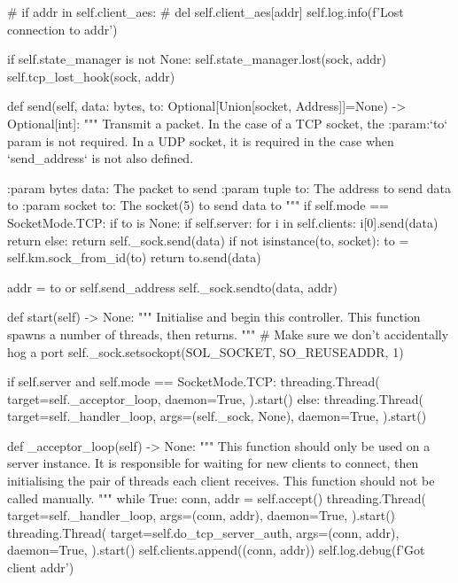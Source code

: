 \begin{pythoncode}
            # if addr in self.client\_aes:
            #     del self.client\_aes[addr]
        self.log.info(f'Lost connection to {addr}')

        if self.state_manager is not None:
            self.state_manager.lost(sock, addr)
        self.tcp_lost_hook(sock, addr)

    def send(self, data: bytes,
             to: Optional[Union[socket, Address]]=None) -> Optional[int]:
        """
        Transmit a packet. In the case of a TCP socket, the :param:`to` param
        is not required. In a UDP socket, it is required in the case when
        `send_address` is not also defined.

        :param bytes data: The packet to send
        :param tuple to: The address to send data to
        :param socket to: The socket(5) to send data to
        """
        if self.mode == SocketMode.TCP:
            if to is None:
                if self.server:
                    for i in self.clients:
                        i[0].send(data)
                    return
                else:
                    return self._sock.send(data)
            if not isinstance(to, socket):
                to = self.km.sock_from_id(to)
            return to.send(data)

        addr = to or self.send_address
        self._sock.sendto(data, addr)

    def start(self) -> None:
        """
        Initialise and begin this controller. This function spawns a number of
        threads, then returns.
        """
        # Make sure we don't accidentally hog a port
        self._sock.setsockopt(SOL_SOCKET, SO_REUSEADDR, 1)

        if self.server and self.mode == SocketMode.TCP:
            threading.Thread(
                target=self._acceptor_loop,
                daemon=True,
            ).start()
        else:
            threading.Thread(
                target=self._handler_loop,
                args=(self._sock, None),
                daemon=True,
            ).start()

    def _acceptor_loop(self) -> None:
        """
        This function should only be used on a server instance. It is
        responsible for waiting for new clients to connect, then initialising
        the pair of threads each client receives.
        This function should not be called manually.
        """
        while True:
            conn, addr = self.accept()
            threading.Thread(
                target=self._handler_loop,
                args=(conn, addr),
                daemon=True,
            ).start()
            threading.Thread(
                target=self.do_tcp_server_auth,
                args=(conn, addr),
                daemon=True,
            ).start()
            self.clients.append((conn, addr))
            self.log.debug(f'Got client {addr}')


\end{pythoncode}
